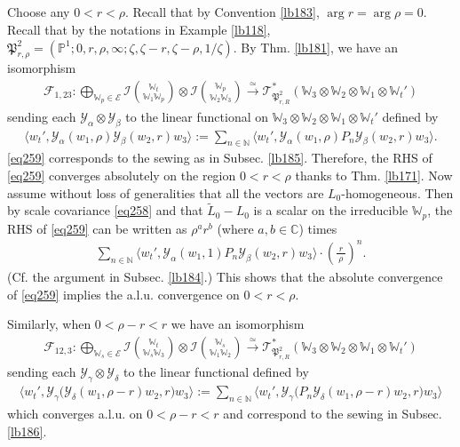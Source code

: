 \documentclass[12pt,a4paper,notitlepage]{article}
\theoremstyle{definition}
\theoremstyle{plain}
\newcommand{\fk}{\mathfrak}
\newcommand{\mc}{\mathcal}
\newcommand{\wtd}{\widetilde}
\newcommand{\bigbk}[1]{\big\langle {#1}\big\rangle}
\newcommand{\scr}{\mathscr}
\newcommand{\Wbb}{\mathbb W}
\newcommand{\Cbb}{\mathbb C}
\newcommand{\Nbb}{\mathbb N}
\newcommand{\Pbb}{\mathbb P}
\numberwithin{equation}{section}
\begin{document}
\subsection{}


Choose any $0<r<\rho$. Recall that by Convention \ref{lb183}, $\arg r=\arg\rho=0$. Recall that by the notations in Example \ref{lb118}, $\fk P^2_{r,\rho}=(\Pbb^1;0,r,\rho,\infty;\zeta,\zeta-r,\zeta-\rho,1/\zeta)$. By Thm. \ref{lb181}, we have an isomorphism
\begin{gather*}
\mc F_{1,23}:\bigoplus_{\Wbb_p\in\mc E}\mc I{\Wbb_t\choose \Wbb_1\Wbb_p}\otimes \mc I{\Wbb_p\choose\Wbb_2\Wbb_3}\xrightarrow{\simeq}\scr T_{\fk P^2_{r,R}}^*(\Wbb_3\otimes\Wbb_2\otimes\Wbb_1\otimes\Wbb_t')
\end{gather*}
sending each $\mc Y_\alpha\otimes\mc Y_\beta$ to the linear functional on $\Wbb_3\otimes\Wbb_2\otimes\Wbb_1\otimes\Wbb_t'$ defined by
\begin{align}\label{eq259}
\bigbk{w_t',\mc Y_\alpha(w_1,\rho)\mc Y_\beta(w_2,r)w_3}:=\sum_{n\in\Nbb}\bigbk{w_t',\mc Y_\alpha(w_1,\rho)P_n\mc Y_\beta(w_2,r)w_3}.
\end{align}
\eqref{eq259} corresponds to the sewing as in Subsec. \ref{lb185}. Therefore, the RHS of \eqref{eq259} converges absolutely on the region $0<r<\rho$ thanks to Thm. \ref{lb171}. Now assume without loss of generalities that all the vectors are $L_0$-homogeneous. Then by scale covariance \eqref{eq258} and that $\wtd L_0-L_0$ is a scalar on the irreducible $\Wbb_p$, the RHS of \eqref{eq259} can be written as $\rho^ar^b$ (where $a,b\in\Cbb$) times
\begin{align*}
\sum_{n\in\Nbb}\bigbk{w_t',\mc Y_\alpha(w_1,1)P_n\mc Y_\beta(w_2,r)w_3}\cdot \left(\frac {~r~}{~\rho~}\right)^n.
\end{align*}
(Cf. the argument in Subsec. \ref{lb184}.) This shows that the absolute convergence of \eqref{eq259} implies the a.l.u. convergence on $0<r<\rho$.



Similarly, when $0<\rho-r<r$ we have an isomorphism
\begin{align*}
\mc F_{12,3}:\bigoplus_{\Wbb_s\in\mc E}\mc I{\Wbb_t\choose \Wbb_s\Wbb_3}\otimes\mc I{\Wbb_s\choose \Wbb_1\Wbb_2}\xrightarrow{\simeq}\scr T_{\fk P^2_{r,R}}^*(\Wbb_3\otimes\Wbb_2\otimes\Wbb_1\otimes\Wbb_t')
\end{align*}
sending each $\mc Y_\gamma\otimes\mc Y_\delta$ to the linear functional defined by
\begin{align}
\bigbk{w_t',\mc Y_\gamma\big(\mc Y_\delta(w_1,\rho-r)w_2,r\big)w_3}:=\sum_{n\in\Nbb}\bigbk{w_t',\mc Y_\gamma\big(P_n\mc Y_\delta(w_1,\rho-r)w_2,r\big)w_3}\label{eq261}
\end{align}
which converges a.l.u. on $0<\rho-r<r$ and correspond to the sewing in Subsec. \ref{lb186}.
\end{document}

